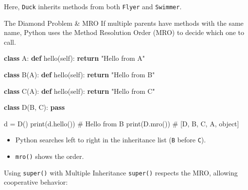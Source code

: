 \documentclass[
  letterpaper,
  DIV=11,
  numbers=noendperiod]{scrreprt}
\newenvironment{Shaded}{\begin{snugshade}}{\end{snugshade}}
\newcommand{\BuiltInTok}[1]{\textcolor[rgb]{0.00,0.23,0.31}{#1}}
\newcommand{\CommentTok}[1]{\textcolor[rgb]{0.37,0.37,0.37}{#1}}
\newcommand{\ControlFlowTok}[1]{\textcolor[rgb]{0.00,0.23,0.31}{\textbf{#1}}}
\newcommand{\KeywordTok}[1]{\textcolor[rgb]{0.00,0.23,0.31}{\textbf{#1}}}
\newcommand{\NormalTok}[1]{\textcolor[rgb]{0.00,0.23,0.31}{#1}}
\newcommand{\OperatorTok}[1]{\textcolor[rgb]{0.37,0.37,0.37}{#1}}
\newcommand{\StringTok}[1]{\textcolor[rgb]{0.13,0.47,0.30}{#1}}
\newcommand{\VariableTok}[1]{\textcolor[rgb]{0.07,0.07,0.07}{#1}}
\providecommand{\tightlist}{%
  \setlength{\itemsep}{0pt}\setlength{\parskip}{0pt}}
\begin{document}
Here, \texttt{Duck} inherits methods from both \texttt{Flyer} and
\texttt{Swimmer}.

The Diamond Problem \& MRO If multiple parents have methods with the
same name, Python uses the Method Resolution Order (MRO) to decide which
one to call.

\begin{Shaded}
\begin{Highlighting}[]
\KeywordTok{class}\NormalTok{ A:}
    \KeywordTok{def}\NormalTok{ hello(}\VariableTok{self}\NormalTok{):}
        \ControlFlowTok{return} \StringTok{"Hello from A"}

\KeywordTok{class}\NormalTok{ B(A):}
    \KeywordTok{def}\NormalTok{ hello(}\VariableTok{self}\NormalTok{):}
        \ControlFlowTok{return} \StringTok{"Hello from B"}

\KeywordTok{class}\NormalTok{ C(A):}
    \KeywordTok{def}\NormalTok{ hello(}\VariableTok{self}\NormalTok{):}
        \ControlFlowTok{return} \StringTok{"Hello from C"}

\KeywordTok{class}\NormalTok{ D(B, C):}
    \ControlFlowTok{pass}

\NormalTok{d }\OperatorTok{=}\NormalTok{ D()}
\BuiltInTok{print}\NormalTok{(d.hello())        }\CommentTok{\# Hello from B}
\BuiltInTok{print}\NormalTok{(D.mro())          }\CommentTok{\# [D, B, C, A, object]}
\end{Highlighting}
\end{Shaded}

\begin{itemize}
\tightlist
\item
  Python searches left to right in the inheritance list (\texttt{B}
  before \texttt{C}).
\item
  \texttt{mro()} shows the order.
\end{itemize}

Using \texttt{super()} with Multiple Inheritance \texttt{super()}
respects the MRO, allowing cooperative behavior:
\end{document}
